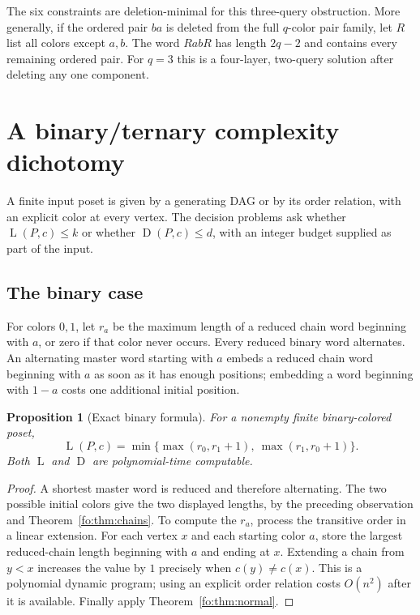 \documentclass[11pt,letterpaper]{article}
\numberwithin{equation}{section}
\newtheorem{proposition}[proposition]{Proposition}
\theoremstyle{definition}
\theoremstyle{remark}
\theoremstyle{definition}
\newcommand{\depth}{\operatorname{D}}
\newcommand{\layers}{\operatorname{L}}
\begin{document}
The six constraints are deletion-minimal for this three-query obstruction.
More generally, if the ordered pair $ba$ is deleted from the full $q$-color
pair family, let $R$ list all colors except $a,b$. The word $RabR$ has length
$2q-2$ and contains every remaining ordered pair. For $q=3$ this is a four-layer,
two-query solution after deleting any one component.

\section{A binary/ternary complexity dichotomy}
\label{fo:sec:complexity}

A finite input poset is given by a generating DAG or by its order relation, with
an explicit color at every vertex. The decision problems ask whether
$\layers(P,c)\le k$ or whether $\depth(P,c)\le d$, with an integer budget supplied
as part of the input.

\subsection{The binary case}
For colors $0,1$, let $r_a$ be the maximum length of a reduced chain word
beginning with $a$, or zero if that color never occurs. Every reduced binary
word alternates. An alternating master word starting with $a$ embeds a reduced
chain word beginning with $a$ as soon as it has enough positions; embedding a
word beginning with $1-a$ costs one additional initial position.

\begin{proposition}[Exact binary formula]\label{fo:prop:binary}
For a nonempty finite binary-colored poset,
\begin{equation}\label{fo:eq:binary}
 \layers(P,c)=
 \min\{\max(r_0,r_1+1),\ \max(r_1,r_0+1)\}.
\end{equation}
Both $\layers$ and $\depth$ are polynomial-time computable.
\end{proposition}
\begin{proof}
A shortest master word is reduced and therefore alternating. The two possible
initial colors give the two displayed lengths, by the preceding observation
and Theorem~\ref{fo:thm:chains}. To compute the $r_a$, process the transitive order
in a linear extension. For each vertex $x$ and each starting color $a$, store
the largest reduced-chain length beginning with $a$ and ending at $x$. Extending
a chain from $y<x$ increases the value by $1$ precisely when $c(y)\ne c(x)$.
This is a polynomial dynamic program; using an explicit order relation costs
$O(n^2)$ after it is available. Finally apply Theorem~\ref{fo:thm:normal}.
\end{proof}
\end{document}
